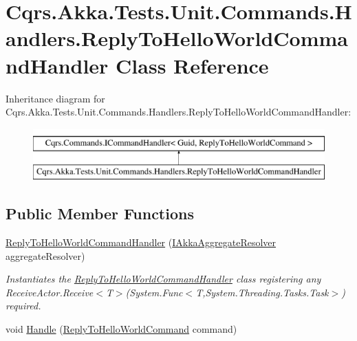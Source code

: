 \hypertarget{classCqrs_1_1Akka_1_1Tests_1_1Unit_1_1Commands_1_1Handlers_1_1ReplyToHelloWorldCommandHandler}{}\section{Cqrs.\+Akka.\+Tests.\+Unit.\+Commands.\+Handlers.\+Reply\+To\+Hello\+World\+Command\+Handler Class Reference}
\label{classCqrs_1_1Akka_1_1Tests_1_1Unit_1_1Commands_1_1Handlers_1_1ReplyToHelloWorldCommandHandler}
Inheritance diagram for Cqrs.\+Akka.\+Tests.\+Unit.\+Commands.\+Handlers.\+Reply\+To\+Hello\+World\+Command\+Handler\+:\begin{figure}[H]
\begin{center}
\leavevmode
\includegraphics[height=2.000000cm]{classCqrs_1_1Akka_1_1Tests_1_1Unit_1_1Commands_1_1Handlers_1_1ReplyToHelloWorldCommandHandler}
\end{center}
\end{figure}
\subsection*{Public Member Functions}
\begin{DoxyCompactItemize}
\item 
\hyperlink{classCqrs_1_1Akka_1_1Tests_1_1Unit_1_1Commands_1_1Handlers_1_1ReplyToHelloWorldCommandHandler_ac3c6ef2299fded8533f7e013e6cf763d_ac3c6ef2299fded8533f7e013e6cf763d}{Reply\+To\+Hello\+World\+Command\+Handler} (\hyperlink{interfaceCqrs_1_1Akka_1_1Domain_1_1IAkkaAggregateResolver}{I\+Akka\+Aggregate\+Resolver} aggregate\+Resolver)
\begin{DoxyCompactList}\small\item\em Instantiates the \hyperlink{classCqrs_1_1Akka_1_1Tests_1_1Unit_1_1Commands_1_1Handlers_1_1ReplyToHelloWorldCommandHandler}{Reply\+To\+Hello\+World\+Command\+Handler} class registering any Receive\+Actor.\+Receive$<$\+T$>$(\+System.\+Func$<$\+T,\+System.\+Threading.\+Tasks.\+Task$>$) required. \end{DoxyCompactList}\item 
void \hyperlink{classCqrs_1_1Akka_1_1Tests_1_1Unit_1_1Commands_1_1Handlers_1_1ReplyToHelloWorldCommandHandler_a647273b7056fc79b8b34b78981f6f193_a647273b7056fc79b8b34b78981f6f193}{Handle} (\hyperlink{classCqrs_1_1Akka_1_1Tests_1_1Unit_1_1Commands_1_1ReplyToHelloWorldCommand}{Reply\+To\+Hello\+World\+Command} command)
\end{DoxyCompactItemize}
